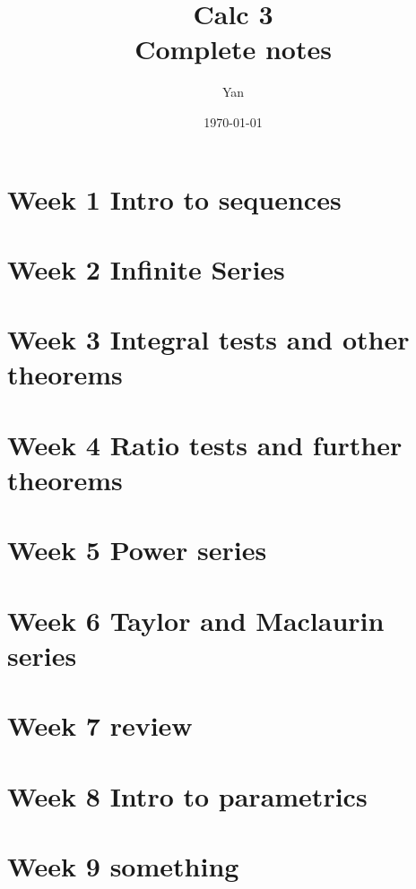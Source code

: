\documentclass{report}
\title{\Huge{Calc 3}\\ Complete notes}
\author{\huge{Yan}}
\date{\today}
\begin{document}
\maketitle
\tableofcontents
\pagebreak

\chapter{Week 1 Intro to sequences}

\chapter{Week 2 Infinite Series}

\chapter{Week 3 Integral tests and other theorems}

\chapter{Week 4 Ratio tests and further theorems}

\chapter{Week 5 Power series}

\chapter{Week 6 Taylor and Maclaurin series}

\chapter{Week 7 review}

\chapter{Week 8 Intro to parametrics}

\chapter{Week 9 something}

\end{document}

